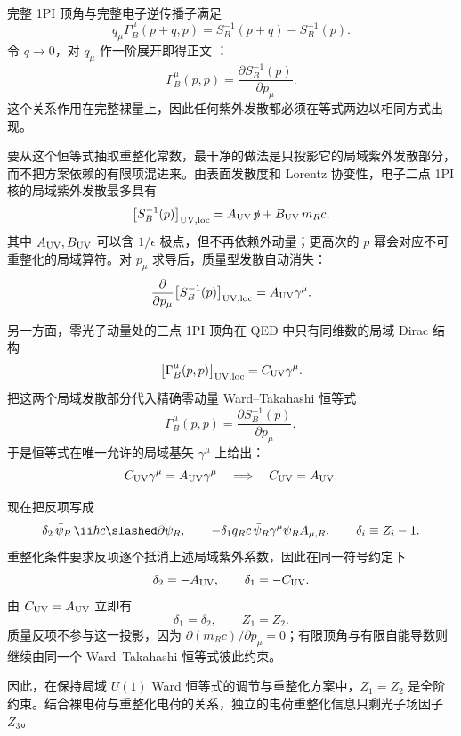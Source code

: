 \begin{derivation}

完整 1PI 顶角与完整电子逆传播子满足
\[
q_\mu\Gamma_B^\mu(p+q,p)
=
S_B^{-1}(p+q)-S_B^{-1}(p).
\]
令 \(q\to0\)，对 \(q_\mu\) 作一阶展开即得正文
：
\[
\Gamma_B^\mu(p,p)
=
\frac{\partial S_B^{-1}(p)}{\partial p_\mu}.
\]
这个关系作用在完整裸量上，因此任何紫外发散都必须在等式两边以相同方式出现。

要从这个恒等式抽取重整化常数，最干净的做法是只投影它的局域紫外发散部分，而不把方案依赖的有限项混进来。由表面发散度和 Lorentz 协变性，电子二点 1PI 核的局域紫外发散最多具有
\begin{equation*}
 \bigl[S_B^{-1}(p)\bigr]_{\rm UV,loc}
 =A_{\rm UV}\,\slashed p
 +B_{\rm UV}\,m_Rc,
\end{equation*}
其中 $A_{\rm UV},B_{\rm UV}$ 可以含 $1/\epsilon$ 极点，但不再依赖外动量；更高次的 $p$ 幂会对应不可重整化的局域算符。对 $p_\mu$ 求导后，质量型发散自动消失：
\begin{equation*}
 \frac{\partial}{\partial p_\mu}
 \bigl[S_B^{-1}(p)\bigr]_{\rm UV,loc}
 =A_{\rm UV}\gamma^\mu.
\end{equation*}

另一方面，零光子动量处的三点 1PI 顶角在 QED 中只有同维数的局域 Dirac 结构
\begin{equation*}
 \bigl[\Gamma_B^\mu(p,p)\bigr]_{\rm UV,loc}
 =C_{\rm UV}\gamma^\mu.
\end{equation*}
把这两个局域发散部分代入精确零动量 Ward--Takahashi 恒等式
\begin{equation*}
 \Gamma_B^\mu(p,p)
 =\frac{\partial S_B^{-1}(p)}{\partial p_\mu},
\end{equation*}
于是恒等式在唯一允许的局域基矢 $\gamma^\mu$ 上给出：
\begin{equation*}
 C_{\rm UV}\gamma^\mu=A_{\rm UV}\gamma^\mu
 \quad\Longrightarrow\quad
 C_{\rm UV}=A_{\rm UV}.
\end{equation*}

现在把反项写成
\begin{equation*}
 \delta_2\,\bar\psi_R\,\ii\hbar c\slashed\partial\psi_R,
 \qquad
 -\delta_1 q_Rc\,\bar\psi_R\gamma^\mu\psi_R A_{\mu,R},
 \qquad
 \delta_i\equiv Z_i-1.
\end{equation*}
重整化条件要求反项逐个抵消上述局域紫外系数，因此在同一符号约定下
\begin{equation*}
 \delta_2=-A_{\rm UV},
 \qquad
 \delta_1=-C_{\rm UV}.
\end{equation*}
由 $C_{\rm UV}=A_{\rm UV}$ 立即有
\begin{equation*}
 \delta_1=\delta_2,
 \qquad
 \boxed{Z_1=Z_2.}
\end{equation*}
质量反项不参与这一投影，因为 $\partial(m_Rc)/\partial p_\mu=0$；有限顶角与有限自能导数则继续由同一个 Ward--Takahashi 恒等式彼此约束。

因此，在保持局域 $U(1)$ Ward 恒等式的调节与重整化方案中，$Z_1=Z_2$ 是全阶约束。结合裸电荷与重整化电荷的关系，独立的电荷重整化信息只剩光子场因子 $Z_3$。
\end{derivation}

